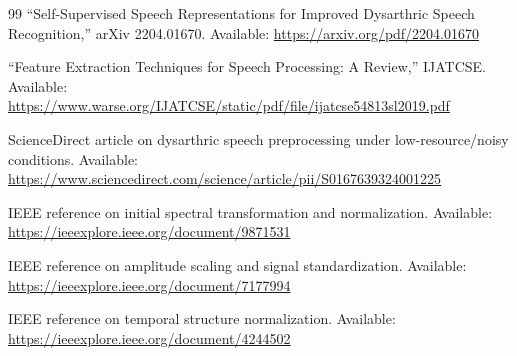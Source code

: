 \documentclass{article}
\begin{document}
\begin{thebibliography}{99}
``Self-Supervised Speech Representations for Improved Dysarthric Speech Recognition,'' arXiv 2204.01670. Available: \url{https://arxiv.org/pdf/2204.01670}

``Feature Extraction Techniques for Speech Processing: A Review,'' IJATCSE. Available: \url{https://www.warse.org/IJATCSE/static/pdf/file/ijatcse54813sl2019.pdf}

ScienceDirect article on dysarthric speech preprocessing under low-resource/noisy conditions. Available: \url{https://www.sciencedirect.com/science/article/pii/S0167639324001225}

IEEE reference on initial spectral transformation and normalization. Available: \url{https://ieeexplore.ieee.org/document/9871531}

IEEE reference on amplitude scaling and signal standardization. Available: \url{https://ieeexplore.ieee.org/document/7177994}

IEEE reference on temporal structure normalization. Available: \url{https://ieeexplore.ieee.org/document/4244502}

\end{thebibliography}
\end{document}

